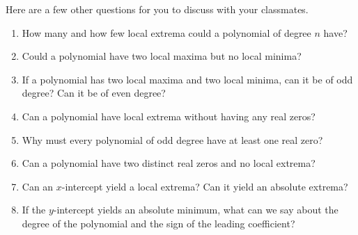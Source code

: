 \documentclass{ximera}
\begin{document}
\begin{problem}
Here are a few other questions for you to discuss with your classmates.  

\begin{enumerate}

\item How many and how few local extrema could a polynomial of degree $n$ have?  
\item Could a polynomial have two local maxima but no local minima?  
\item If a polynomial has two local maxima and two local minima, can it be of odd degree?  Can it be of even degree?
\item Can a polynomial have local extrema without having any real zeros?
\item Why must every polynomial of odd degree have at least one real zero?
\item Can a polynomial have two distinct real zeros and no local extrema?
\item Can an $x$-intercept yield a local extrema?  Can it yield an absolute extrema?
\item If the $y$-intercept yields an absolute minimum, what can we say about the degree of the polynomial and the sign of the leading coefficient?   

\end{enumerate}
\end{problem}
\end{document}
